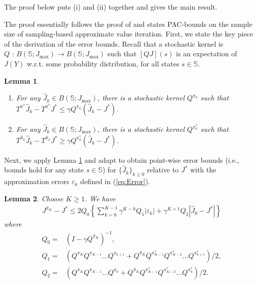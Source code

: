\documentclass[12pt,technote,onecolumn]{IEEEtran}
\newtheorem{lemma}{Lemma}
\begin{document}
The proof below puts (i) and (ii)
together and gives the main result.
\begin{IEEEproof}
	The proof essentially follows the proof of \cite[Theorem 2]{munos2008finite}
	and states PAC-bounds on the sample size of sampling-based approximate
	value iteration. First, we state the key piece of the derivation of
	the error bounds. Recall that a stochastic kernel is $Q\mbox{ : }B\left(\mathbb{S};J_{\max}\right)\rightarrow B\left(\mathbb{S};J_{\max}\right)$
	such that $[QJ](s)$ is an expectation of
	$J\left(Y\right)$ w.r.t. some probability distribution,
	for all states $s\in\mathbb{S}$.
	\begin{lemma}
		\label{lem:p-norm} 
		\begin{enumerate}
			\item For any $\widehat{J}_{k}\in B\left(\mathbb{S};J_{\max}\right)$,
			there is a stochastic kernel $Q^{\pi_{k}}$ such that $T^{\pi^{*}}\widehat{J}_{k}-T^{\pi^{*}}J^{*}\leq\gamma Q^{\pi_{k}}(\widehat{J}_{k}-J^{*})$.
			\item For any $\widehat{J}_{k}\in B\left(\mathbb{S};J_{\max}\right)$,
			there is a stochastic kernel $Q^{\pi_{k}^{*}}$ such that $T^{\hat{\pi}_{k}}\widehat{J}_{k}-T^{\hat{\pi}_{k}}J^{*}\geq\gamma Q^{\pi_{k}^{*}}(\widehat{J}_{k}-J^{*})$.
		\end{enumerate}
	\end{lemma}
	
	Next, we apply Lemma \ref{lem:p-norm} and adapt \cite[Lemma 3]{munos2008finite} to obtain point-wise
	error bounds (i.e., bounds hold for any state $s\in\mathbb{S}$)
	for $\{ \widehat{J}_{k}\} _{k\geq0}$ relative to $J^{*}$
	with the approximation errors $\varepsilon_{k}$ defined in (\ref{eq:Error}). 
	\begin{lemma}
		\label{lem:Point error bounds} Choose $K\geq1$. We have
		\begin{equation*}		
		\begin{aligned}
		J^{\widehat{\pi}_{K}}-J^{*}\leq2Q_0
		\left\{ \sum_{k=0}^{K-1}\gamma^{K-k}Q_{1}|\varepsilon_{k}|
		+\gamma^{K+1}Q_{2}|\widehat{J}_{0}-J^{*}|\right\} 
		\end{aligned}
		\end{equation*}
		where  
		\begin{equation*}		
		\begin{aligned}
		Q_0=&(I-\gamma Q^{\hat{\pi}_{K}})^{-1},\\
		Q_{1}=&(Q^{\pi_{K}}Q^{\pi_{K-1}}\dots Q^{\pi_{k+1}}
		+Q^{\hat{\pi}_{K}}Q^{\pi_{K-1}^{*}}Q^{\pi_{K-2}^{*}}\dots Q^{\pi_{k+1}^{*}})/2,\\
		Q_{2}=&(Q^{\pi_{K}}Q^{\pi_{K-1}}\dots Q^{\pi_{0}}
		+Q^{\hat{\pi}_{K}}Q^{\pi_{K-1}^{*}}Q^{\pi_{K-2}^{*}}\dots Q^{\pi_{0}^{*}})/2.
		\end{aligned}
		\end{equation*}
	\end{lemma}
	

\end{IEEEproof}
\end{document}

